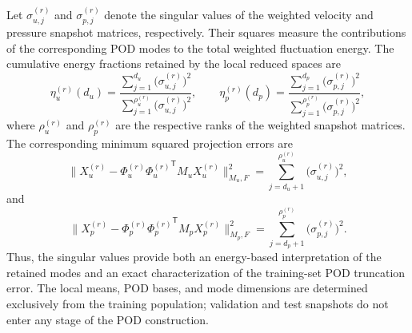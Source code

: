 Let $\sigma_{u,j}^{(r)}$ and $\sigma_{p,j}^{(r)}$ denote the singular values
of the weighted velocity and pressure snapshot matrices, respectively.  Their
squares measure the contributions of the corresponding POD modes to the
total weighted fluctuation energy.  The cumulative energy fractions retained
by the local reduced spaces are
\begin{equation}
\eta_u^{(r)}(d_u) = 
\frac{
\displaystyle
\sum_{j=1}^{d_u}
\bigl(\sigma_{u,j}^{(r)}\bigr)^2
}{
\displaystyle
\sum_{j=1}^{\rho_u^{(r)}}
\bigl(\sigma_{u,j}^{(r)}\bigr)^2
},
\qquad
\eta_p^{(r)}(d_p) = 
\frac{
\displaystyle
\sum_{j=1}^{d_p}
\bigl(\sigma_{p,j}^{(r)}\bigr)^2
}{
\displaystyle
\sum_{j=1}^{\rho_p^{(r)}}
\bigl(\sigma_{p,j}^{(r)}\bigr)^2
},
\label{eq:local_pod_energy_fractions}
\end{equation}
where $\rho_u^{(r)}$ and $\rho_p^{(r)}$ are the respective ranks of the
weighted snapshot matrices.  The corresponding minimum squared projection
errors are
\begin{equation}
\bigl\|
X_u^{(r)}
-
\Phi_u^{(r)}{\Phi_u^{(r)}}^{\mathsf T}
M_uX_u^{(r)}
\bigr\|_{M_u,F}^{2}
= \sum_{j=d_u+1}^{\rho_u^{(r)}}
\bigl(\sigma_{u,j}^{(r)}\bigr)^2,
\label{eq:velocity_pod_truncation_error}
\end{equation}
and
\begin{equation}
\bigl\|
X_p^{(r)}
-
\Phi_p^{(r)}{\Phi_p^{(r)}}^{\mathsf T}
M_pX_p^{(r)}
\bigr\|_{M_p,F}^{2}
= \sum_{j=d_p+1}^{\rho_p^{(r)}}
\bigl(\sigma_{p,j}^{(r)}\bigr)^2.
\label{eq:pressure_pod_truncation_error}
\end{equation}
Thus, the singular values provide both an energy-based interpretation of the
retained modes and an exact characterization of the training-set POD
truncation error.  The local means, POD bases, and mode dimensions are
determined exclusively from the training population; validation and test
snapshots do not enter any stage of the POD construction.

